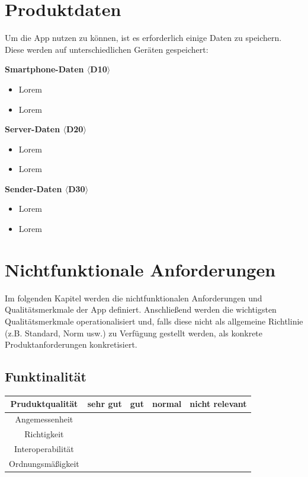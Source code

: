 \documentclass[parskip=full]{scrartcl}
\begin{document}
\section{Produktdaten}
Um die App nutzen zu können, ist es erforderlich einige Daten zu speichern. Diese werden auf unterschiedlichen Geräten gespeichert:

\textbf{Smartphone-Daten $\langle$D10$\rangle$}
\begin{itemize}
    \item Lorem
    \item Lorem
\end{itemize}

\textbf{Server-Daten $\langle$D20$\rangle$}
\begin{itemize}
    \item Lorem
    \item Lorem
\end{itemize}

\textbf{Sender-Daten $\langle$D30$\rangle$}
\begin{itemize}
    \item Lorem
    \item Lorem
\end{itemize}

\section{Nichtfunktionale Anforderungen}
Im folgenden Kapitel werden die nichtfunktionalen Anforderungen und Qualitätsmerkmale der App definiert.
Anschließend werden die wichtigsten Qualitätsmerkmale operationalisiert und, falls diese nicht als allgemeine Richtlinie (z.B. Standard, Norm usw.) zu Verfügung gestellt werden,
als konkrete Produktanforderungen konkretisiert.

\subsection{Funktinalität}
\begin{tabular}{| c | c | c | c | c |}
    \hline
    \textbf{Pruduktqualität} & \textbf{sehr gut} & \textbf{gut} & \textbf{normal} & \textbf{nicht relevant} \\ \hline
    Angemessenheit           &                   &              &                 &                         \\ \hline
    Richtigkeit              &                   &              &                 &                         \\ \hline
    Interoperabilität        &                   &              &                 &                         \\ \hline
    Ordnungsmäßigkeit        &                   &              &                 &                         \\ \hline
\end{tabular}
\end{document}
